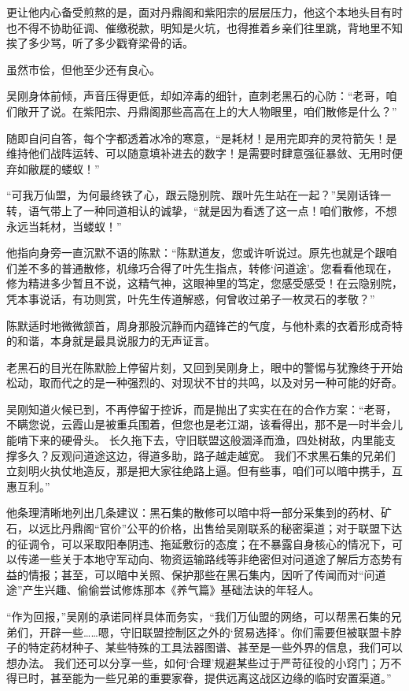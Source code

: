 更让他内心备受煎熬的是，面对丹鼎阁和紫阳宗的层层压力，他这个本地头目有时也不得不协助征调、催缴税款，明知是火坑，也得推着乡亲们往里跳，背地里不知挨了多少骂，听了多少戳脊梁骨的话。

虽然市侩，但他至少还有良心。

吴刚身体前倾，声音压得更低，却如淬毒的细针，直刺老黑石的心防：“老哥，咱们敞开了说。在紫阳宗、丹鼎阁那些高高在上的大人物眼里，咱们散修是什么？”

随即自问自答，每个字都透着冰冷的寒意，“是耗材！是用完即弃的灵符箭矢！是维持他们战阵运转、可以随意填补进去的数字！是需要时肆意强征暴敛、无用时便弃如敝屣的蝼蚁！”

“可我万仙盟，为何最终铁了心，跟云隐别院、跟叶先生站在一起？”吴刚话锋一转，语气带上了一种同道相认的诚挚，“就是因为看透了这一点！咱们散修，不想永远当耗材，当蝼蚁！”

他指向身旁一直沉默不语的陈默：“陈默道友，您或许听说过。原先也就是个跟咱们差不多的普通散修，机缘巧合得了叶先生指点，转修‘问道途’。您看看他现在，修为精进多少暂且不说，这精气神，这眼神里的笃定，您感受感受！在云隐别院，凭本事说话，有功则赏，叶先生传道解惑，何曾收过弟子一枚灵石的孝敬？”

陈默适时地微微颔首，周身那股沉静而内蕴锋芒的气度，与他朴素的衣着形成奇特的和谐，本身就是最具说服力的无声证言。

老黑石的目光在陈默脸上停留片刻，又回到吴刚身上，眼中的警惕与犹豫终于开始松动，取而代之的是一种强烈的、对现状不甘的共鸣，以及对另一种可能的好奇。

吴刚知道火候已到，不再停留于控诉，而是抛出了实实在在的合作方案：“老哥，不瞒您说，云霞山是被重兵围着，但您也是老江湖，该看得出，那不是一时半会儿能啃下来的硬骨头。 长久拖下去，守旧联盟这般涸泽而渔，四处树敌，内里能支撑多久？反观问道途这边，得道多助，路子越走越宽。 我们不求黑石集的兄弟们立刻明火执仗地造反，那是把大家往绝路上逼。但有些事，咱们可以暗中携手，互惠互利。”

他条理清晰地列出几条建议：黑石集的散修可以暗中将一部分采集到的药材、矿石，以远比丹鼎阁“官价”公平的价格，出售给吴刚联系的秘密渠道；对于联盟下达的征调令，可以采取阳奉阴违、拖延敷衍的态度；在不暴露自身核心的情况下，可以传递一些关于本地守军动向、物资运输路线等非绝密但对问道途了解后方态势有益的情报；甚至，可以暗中关照、保护那些在黑石集内，因听了传闻而对“问道途”产生兴趣、偷偷尝试修炼那本《养气篇》基础法诀的年轻人。

“作为回报，”吴刚的承诺同样具体而务实，“我们万仙盟的网络，可以帮黑石集的兄弟们，开辟一些……嗯，守旧联盟控制区之外的‘贸易选择’。你们需要但被联盟卡脖子的特定药材种子、某些特殊的工具法器图谱、甚至是一些外界的信息，我们可以想办法。 我们还可以分享一些，如何‘合理’规避某些过于严苛征役的小窍门；万不得已时，甚至能为一些兄弟的重要家眷，提供远离这战区边缘的临时安置渠道。”


